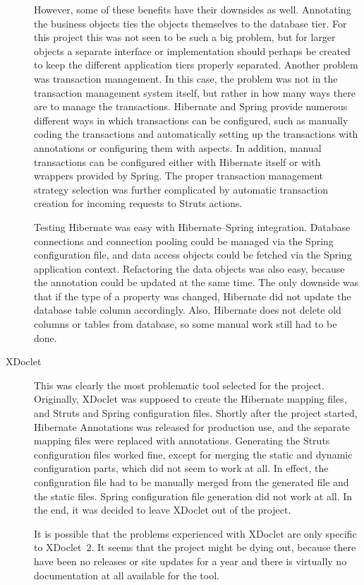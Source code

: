 \begin{description}
However, some of these benefits have their downsides as well. 
Annotating the business objects ties the objects themselves to the 
database tier. For this project this was not seen to be such a big 
problem, but for larger objects a separate interface or implementation 
should perhaps be created to keep the different application tiers 
properly separated. Another problem was transaction management. In 
this case, the problem was not in the transaction management system 
itself, but rather in how many ways there are to manage the 
transactions. Hibernate and Spring provide numerous different ways in 
which transactions can be configured, such as manually coding the 
transactions and automatically setting up the transactions with 
annotations or configuring them with aspects. In addition, manual 
transactions can be configured either with Hibernate itself or with 
wrappers provided by Spring. The proper transaction management 
strategy selection was further complicated by automatic transaction 
creation for incoming requests to Struts actions.

Testing Hibernate was easy with Hibernate--Spring integration. 
Database connections and connection pooling could be managed via the 
Spring configuration file, and data access objects could be fetched 
via the Spring application context. Refactoring the data objects was 
also easy, because the annotation could be updated at the same time. 
The only downside was that if the type of a property was changed, 
Hibernate did not update the database table column accordingly. Also, 
Hibernate does not delete old columns or tables from database, so some 
manual work still had to be done.

\item[XDoclet] This was clearly the most problematic tool selected for 
the project. Originally, XDoclet was supposed to create the Hibernate 
mapping files, and Struts and Spring configuration files. Shortly 
after the project started, Hibernate Annotations was released for 
production use, and the separate mapping files were replaced with 
annotations. Generating the Struts configuration files worked fine, 
except for merging the static and dynamic configuration parts, which 
did not seem to work at all. In effect, the configuration file had to 
be manually merged from the generated file and the static files. 
Spring configuration file generation did not work at all. In the end,
it was decided to leave XDoclet out of the project. 

It is possible that the problems experienced with XDoclet are only 
specific to XDoclet~2. It seems that the project might be dying out, 
because there have been no releases or site updates for a year and 
there is virtually no documentation at all available for the tool.


\end{description}
